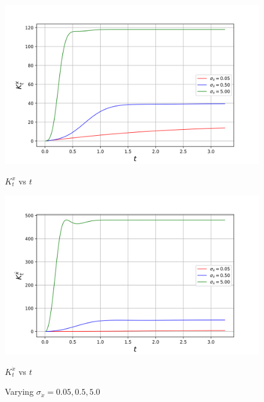 \begin{figure}[H]
    \centering
    \begin{minipage}{0.49\linewidth}
        \centering
        \includegraphics[width=\linewidth]{plots/part1-e.1-kx.png}
        \caption*{$K^x_t$ vs $t$}

    \end{minipage}
    \hfill
    \begin{minipage}{0.49\linewidth}
        \centering
        \includegraphics[width=\linewidth]{plots/part1-e.1-kv.png}
         \caption*{$K^{\dot{x}}_t$ vs $t$}
    \end{minipage}
    \caption{Varying $\sigma_{\dot{x}} = 0.05, 0.5, 5.0$}
    \label{fig:part1-gain_sigma_x_dot}
    
\end{figure}
